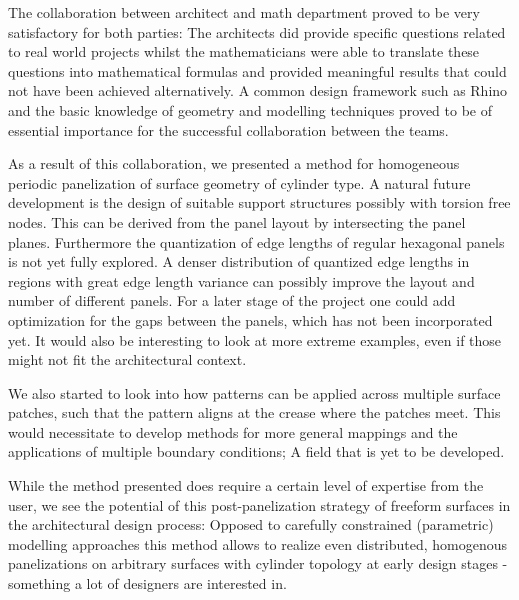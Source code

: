 \documentclass[Thesis.tex]{subfiles}
\begin{document}
The collaboration between architect and math department proved to be
very satisfactory for both parties: The architects did provide
specific questions related to real world projects whilst the
mathematicians were able to translate these questions into
mathematical formulas and provided meaningful results that could not
have been achieved alternatively. A common design framework such as Rhino
and the basic knowledge of \nurbs geometry and modelling techniques
proved to be of essential importance for the successful collaboration
between the teams.

As a result of this collaboration, we presented a method for
homogeneous periodic panelization of \nurbs surface geometry of
cylinder type.  A natural future development is the design of suitable
support structures possibly with torsion free nodes. This can be
derived from the panel layout by intersecting the panel
planes. Furthermore the quantization of edge lengths of regular
hexagonal panels is not yet fully explored. A denser distribution of
quantized edge lengths in regions with great edge length variance can
possibly improve the layout and number of different panels. 
%
For a later stage of the project one could add optimization for the
gaps between the panels, which has not been incorporated yet. It would
also be interesting to look at more extreme examples, even if those
might not fit the architectural context.

We also started to look into how patterns can be applied across
multiple surface patches, such that the pattern aligns at the crease
where the patches meet. This would necessitate to develop methods for
more general mappings and the applications of multiple boundary
conditions; A field that is yet to be developed.

While the method presented does require a certain level of expertise
from the user, we see the potential of this post-panelization strategy
of freeform surfaces in the architectural design process: Opposed to
carefully constrained (parametric) modelling approaches this method
allows to realize even distributed, homogenous panelizations on
arbitrary surfaces with cylinder topology at early design stages -
something a lot of designers are interested in.

%
%
%
%
%
%
%
%

\subfilebibliographytwo
\end{document}

